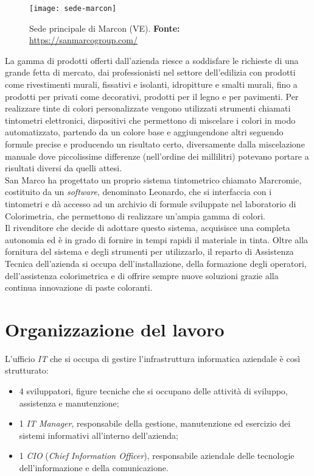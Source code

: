 \vspace{10pt}
\begin{figure}[htbp]
	\begin{center}
		\texttt{[image: sede-marcon]}
		\caption{Sede principale di Marcon (VE). \newline \textbf{Fonte: }\url{https://sanmarcogroup.com/}}
	\end{center}
\end{figure}
\vspace{10pt}

La gamma di prodotti offerti dall'azienda riesce a soddisfare le richieste di una grande fetta di mercato, dai professionisti nel settore dell'edilizia con prodotti come rivestimenti murali, fissativi e isolanti, idropitture e smalti murali, fino a prodotti per privati come decorativi, prodotti per il legno e per pavimenti.
Per realizzare tinte di colori personalizzate vengono utilizzati strumenti chiamati tintometri elettronici, dispositivi che permettono di miscelare i colori in modo automatizzato, partendo da un colore base e aggiungendone altri seguendo formule precise e producendo un risultato certo, diversamente dalla miscelazione manuale dove piccolissime differenze (nell'ordine dei millilitri) potevano portare a risultati diversi da quelli attesi. \\
San Marco ha progettato un proprio sistema tintometrico chiamato Marcromie, costituito da un \textit{software}, denominato Leonardo, che si interfaccia con i tintometri e dà accesso ad un archivio di formule sviluppate nel laboratorio di Colorimetria, che permettono di realizzare un'ampia gamma di colori. \\
Il rivenditore che decide di adottare questo sistema, acquisisce una completa autonomia ed è in grado di fornire in tempi rapidi il materiale in tinta. Oltre alla fornitura del sistema e degli strumenti per utilizzarlo, il reparto di Assistenza Tecnica dell'azienda si occupa dell'installazione, della formazione degli operatori, dell'assistenza colorimetrica e di offrire sempre nuove soluzioni grazie alla continua innovazione di paste coloranti. 


\section{Organizzazione del lavoro}

L'ufficio \textit{IT} che si occupa di gestire l'infrastruttura informatica aziendale è così strutturato: 
\begin{itemize}
	\item 4 sviluppatori, figure tecniche che si occupano delle attività di sviluppo, assistenza e manutenzione; 
	\item 1 \textit{IT Manager}, responsabile della gestione, manutenzione ed esercizio dei sistemi informativi all'interno dell'azienda; 
	\item 1 \textit{CIO} (\textit{Chief Information Officer}), responsabile aziendale delle tecnologie dell'informazione e della comunicazione.
\end{itemize}

